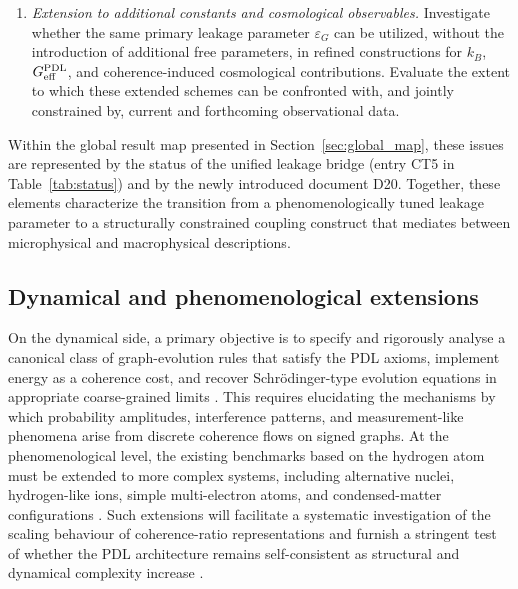 \documentclass[11pt,a4paper]{article}
\newcommand{\PDL}{\textnormal{PDL}}
\begin{document}
\begin{enumerate}[label=(\roman*), leftmargin=*]
  In addition, investigate whether alternative PDL-compatible architectures exist that simultaneously reproduce $G$ and $\alpha$ while violating this bridge relation, thereby systematically probing the uniqueness and structural stability of the proposed $G$--$\alpha$ correspondence.
  
  \item \emph{Extension to additional constants and cosmological observables.}  Investigate whether the same primary leakage parameter $\varepsilon_G$ can be utilized, without the introduction of additional free parameters, in refined constructions for $k_B$, $G_{\mathrm{eff}}^{\PDL}$, and coherence-induced cosmological contributions. Evaluate the extent to which these extended schemes can be confronted with, and jointly constrained by, current and forthcoming observational data.
\end{enumerate}
Within the global result map presented in Section~\ref{sec:global_map}, these issues are represented by the status of the unified leakage bridge (entry CT5 in Table~\ref{tab:status}) and by the newly introduced document D20. Together, these elements characterize the transition from a phenomenologically tuned leakage parameter to a structurally constrained coupling construct that mediates between microphysical and macrophysical descriptions.


\subsection{Dynamical and phenomenological extensions}
\label{subsec:roadmap_dynamical}

On the dynamical side, a primary objective is to specify and rigorously analyse a canonical class of graph-evolution rules that satisfy the PDL axioms, implement energy as a coherence cost, and recover Schr\"odinger-type evolution equations in appropriate coarse-grained limits \citep{Coherence_Leakage_18_2026,Coherence_Leakage_18_2026}. This requires elucidating the mechanisms by which probability amplitudes, interference patterns, and measurement-like phenomena arise from discrete coherence flows on signed graphs. At the phenomenological level, the existing benchmarks based on the hydrogen atom must be extended to more complex systems, including alternative nuclei, hydrogen-like ions, simple multi-electron atoms, and condensed-matter configurations \citep{PDL_Main_2026,Schrodinger_Sketch_v2_2026}. Such extensions will facilitate a systematic investigation of the scaling behaviour of coherence-ratio representations and furnish a stringent test of whether the PDL architecture remains self-consistent as structural and dynamical complexity increase \cite{PDL_position}.
\end{document}
